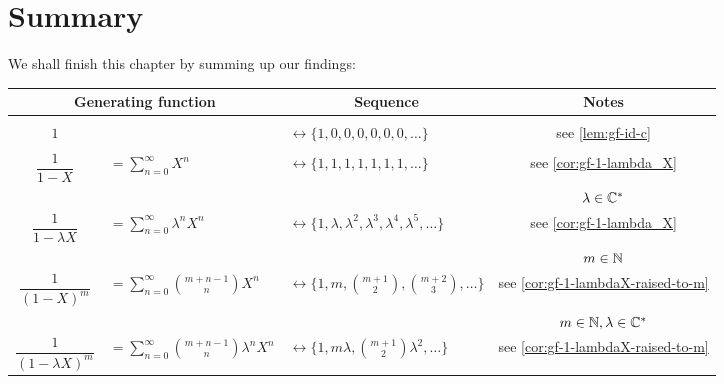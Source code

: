 \documentclass[a4paper, 12pt]{report}
\begin{document}
\section{Summary}\label{sec:gf-summary}
We shall finish this chapter by summing up our findings:
\begin{table}[h]
    \centering
    \begin{tabular}{c l l | c}
    \multicolumn{2}{c}{\textbf{Generating function}} & \multicolumn{1}{c}{\textbf{Sequence}} & \textbf{Notes}\\\hline
    
    &&&\\
    $1$ 
    & 
    & $\longleftrightarrow \{1, 0, 0, 0, 0, 0, 0, \dots\}$ 
    &see \cref{lem:gf-id-c}\\
    
    &&&\\
    $\dfrac{1}{1 - X}$ 
    & $= \sum_{n = 0}^\infty X^n$ 
    & $\longleftrightarrow \{1, 1, 1, 1, 1, 1, 1, \dots\}$ 
    &see \cref{cor:gf-1-lambda_X}\\
    
    &&&$\lambda \in \mathbb{C}^*$\\
    $\dfrac{1}{1 - \lambda X}$ 
    & $= \sum_{n = 0}^\infty \lambda^n X^n$ 
    & $\longleftrightarrow \{1, \lambda, \lambda^2, \lambda^3, \lambda^4, \lambda^5, \dots\}$ 
    &see \cref{cor:gf-1-lambda_X}\\
    
    
    &&&$m \in \mathbb{N}$\\
    $\dfrac{1}{(1 - X)^m}$
    & $= \sum_{n = 0}^{\infty} \binom{m + n - 1}{n} X^n$
    & $\longleftrightarrow \{1, m, \binom{m + 1}{2}, \binom{m + 2}{3}, \dots\}$
    & see \cref{cor:gf-1-lambdaX-raised-to-m}\\
    
    &&&$m \in \mathbb{N}, \lambda \in \mathbb{C}^*$\\
    $\dfrac{1}{(1 - \lambda X)^m}$
    & $= \sum_{n = 0}^{\infty} \binom{m + n - 1}{n} \lambda^n X^n$
    & $\longleftrightarrow \{1, m \lambda, \binom{m + 1}{2} \lambda^2, \dots\}$
    & see \cref{cor:gf-1-lambdaX-raised-to-m}
    
    \end{tabular}
    \label{tab:my_label}
\end{table}
\end{document}
